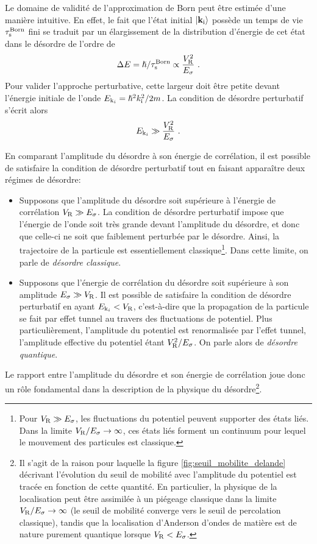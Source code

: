 Le domaine de validité de l'approximation de Born peut être estimée d'une manière intuitive. En effet, le fait que l'état initial $\left| \mathbf{k}_{\mathrm{i}} \right\rangle$ possède un temps de vie $\tau_{\mathrm{s}}^{\mathrm{Born}}$ fini se traduit par un élargissement de la distribution d'énergie de cet état dans le désordre de l'ordre de 
\begin{equation}
\Delta E= \hslash/\tau_{\mathrm{s}}^{\mathrm{Born}}\propto \frac{V_{\mathrm{R}}^2}{E_{\sigma}} \text{ .}
\end{equation} 
Pour valider l'approche perturbative, cette largeur doit être petite devant l'énergie initiale de l'onde $E_{\mathrm{k}_i}=\hslash^2 k_{\mathrm{i}}^2 /2m$. La condition de désordre perturbatif s'écrit alors \citep{kuhn2007coherent}
\begin{equation}
E_{\mathrm{k}_i}\gg \frac{V_{\mathrm{R}}^2}{E_{\sigma}} \text{ .}
\label{eq:critere_kuhn}
\end{equation}

En comparant l'amplitude du désordre à son énergie de corrélation, il est possible de satisfaire la condition de désordre perturbatif tout en faisant apparaître deux régimes de désordre:
\begin{itemize}
\item[\textendash] Supposons que l'amplitude du désordre soit supérieure à l'énergie de corrélation $V_{\mathrm{R}}\gg E_{\sigma}$. La condition de désordre perturbatif impose que l'énergie de l'onde soit très grande devant l'amplitude du désordre, et donc que celle-ci ne soit que faiblement perturbée par le désordre. Ainsi, la trajectoire de la particule est essentiellement classique\footnote{Pour $V_{\mathrm{R}}\gg E_{\sigma}$, les fluctuations du potentiel peuvent supporter des états liés. Dans la limite $V_{\mathrm{R}}/E_{\sigma}\rightarrow\infty$, ces états liés forment un continuum pour lequel le mouvement des particules est classique.}. Dans cette limite, on parle de \emph{désordre classique}.
\item[\textendash] Supposons que l'énergie de corrélation du désordre soit supérieure à son amplitude $E_{\sigma}\gg V_{\mathrm{R}}$. Il est possible de satisfaire la condition de désordre perturbatif en ayant $E_{\mathrm{k}_i}<V_{\mathrm{R}}$, c'est-à-dire que la propagation de la particule se fait par effet tunnel au travers des fluctuations de potentiel. Plus particulièrement, l'amplitude du potentiel est renormalisée par l'effet tunnel, l'amplitude effective du potentiel étant $V_{\mathrm{R}}^2/E_{\sigma}$. On parle alors de \emph{désordre quantique}.
\end{itemize}
Le rapport entre l'amplitude du désordre et son énergie de corrélation joue donc un rôle fondamental dans la description de la physique du désordre\footnote{Il s'agit de la raison pour laquelle la figure \ref{fig:seuil_mobilite_delande} décrivant l'évolution du seuil de mobilité avec l'amplitude du potentiel est tracée en fonction de cette quantité. En particulier, la physique de la localisation peut être assimilée à un piégeage classique dans la limite $V_{\mathrm{R}}/E_{\sigma}\rightarrow\infty$ (le seuil de mobilité converge vers le seuil de percolation classique), tandis que la localisation d'Anderson d'ondes de matière est de nature purement quantique lorsque $V_{\mathrm{R}}<E_{\sigma}$.}. 

